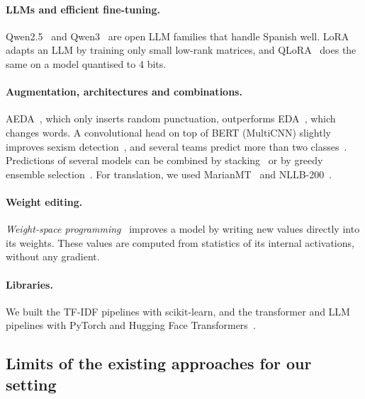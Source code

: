 \documentclass[pdflatex,sn-mathphys-num]{sn-jnl}
\begin{document}
\paragraph{LLMs and efficient fine-tuning.} Qwen2.5~\cite{qwen25} and Qwen3~\cite{qwen3} are open LLM families that handle Spanish well. LoRA~\cite{hu2022lora} adapts an LLM by training only small low-rank matrices, and QLoRA~\cite{dettmers2023qlora} does the same on a model quantised to 4 bits.

\paragraph{Augmentation, architectures and combinations.} AEDA~\cite{karimi2021aeda}, which only inserts random punctuation, outperforms EDA~\cite{wei2019eda}, which changes words. A convolutional head on top of BERT (MultiCNN) slightly improves sexism detection~\cite{kalra2021sexism}, and several teams predict more than two classes~\cite{fang2024nycu,nowakowski2025grootwatch}. Predictions of several models can be combined by stacking~\cite{wolpert1992stacking} or by greedy ensemble selection~\cite{caruana2004ensemble}. For translation, we used MarianMT~\cite{marianmt} and NLLB-200~\cite{nllb2022}.

\paragraph{Weight editing.} \emph{Weight-space programming}~\cite{takehi2026wsp} improves a model by writing new values directly into its weights. These values are computed from statistics of its internal activations, without any gradient.

\paragraph{Libraries.} We built the TF-IDF pipelines with scikit-learn, and the transformer and LLM pipelines with PyTorch and Hugging Face Transformers~\cite{wolf2020transformers}.

\subsection{Limits of the existing approaches for our setting}
\end{document}
